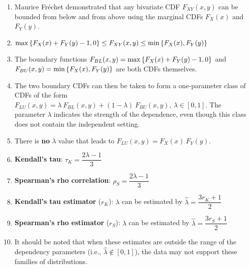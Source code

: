 \begin{enumerate}
    \item Maurice Fréchet demonstrated that any bivariate CDF $F _{X Y} (x, y)$ can be bounded from below and from above using the marginal CDFs $F_X (x)$ and $F_Y (y)$.
    \hfill \cite{statistics/book/Statistics-for-Data-Scientists/Maurits-Kaptein}

    \item
    $
        \max\left\{F_X (x) + F_Y (y) - 1, 0\right\}
        \leq
        F _{X Y} (x, y)
        \leq
        \min\left\{F_X (x), F_Y (y)\right\}
    $
    \hfill \cite{statistics/book/Statistics-for-Data-Scientists/Maurits-Kaptein}

    \item The boundary functions $F_{B L} (x, y) = \max\left\{F_X (x) + F_Y (y) - 1, 0\right\}$ and $F_{ BU} (x, y) = \min\left\{F_X (x), F_Y (y)\right\}$ are both CDFs themselves.
    \hfill \cite{statistics/book/Statistics-for-Data-Scientists/Maurits-Kaptein}

    \item The two boundary CDFs can then be taken to form a one-parameter class of CDFs of the form $F_{LU} (x, y) = \lambda\ F_{B L} (x, y) + (1 - \lambda)\ F_{BU} (x, y),\ \lambda \in [0, 1]$.
    The parameter $\lambda$ indicates the strength of the dependence, even though this class does not contain the independent setting.
    \hfill \cite{statistics/book/Statistics-for-Data-Scientists/Maurits-Kaptein}

    \item There is \textbf{no} $\lambda$ value that leads to $F_{LU} (x, y) = F_X (x)\ F_Y (y)$.
    \hfill \cite{statistics/book/Statistics-for-Data-Scientists/Maurits-Kaptein}

    \item \textbf{Kendall’s tau}: $\tau_K = \dfrac{2\lambda - 1}{3}$
    \hfill \cite{statistics/book/Statistics-for-Data-Scientists/Maurits-Kaptein}

    \item \textbf{Spearman’s rho correlation}: $\rho_S = \dfrac{2\lambda -1}{3}$
    \hfill \cite{statistics/book/Statistics-for-Data-Scientists/Maurits-Kaptein}

    \item \textbf{Kendall’s tau estimator} ($r_K$):
    $\lambda$ can be estimated by $\hat{\lambda} = \dfrac{3r_K + 1}{2}$
    \hfill \cite{statistics/book/Statistics-for-Data-Scientists/Maurits-Kaptein}

    \item \textbf{Spearman’s rho estimator} ($r_S$):
    $\lambda$ can be estimated by $\hat{\lambda} = \dfrac{3r_S + 1}{2}$
    \hfill \cite{statistics/book/Statistics-for-Data-Scientists/Maurits-Kaptein}

    \item[] It should be noted that when these estimates are outside the range of the dependency parameters (i.e., $\hat{\lambda} \notin [0, 1]$), the data may not support these families of distributions.
    \hfill \cite{statistics/book/Statistics-for-Data-Scientists/Maurits-Kaptein}
\end{enumerate}



